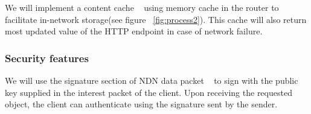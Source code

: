 We will implement a content cache ~\cite{zhang2014named} using memory cache in the router to facilitate in-network storage(see figure ~\ref{fig:process2}). This cache will also return most updated value of the HTTP endpoint in case of network failure.

\subsubsection{Security features}

We will use the signature section of NDN data packet ~\cite{zhang2014named} to sign with the public key supplied in the interest packet of the client. Upon receiving the requested object, the client can authenticate using the signature sent by the sender.
